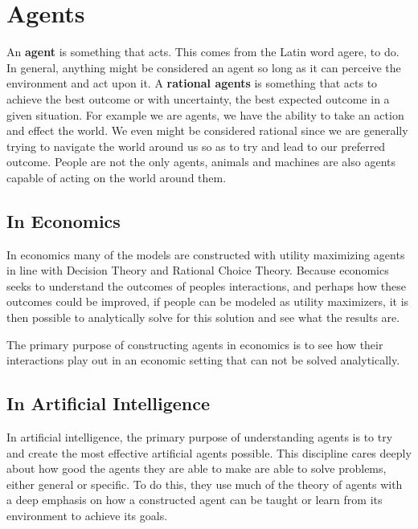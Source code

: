 \documentclass[12pt,twoside]{reedthesis}
\begin{document}
\section{Agents}
An \textbf{agent} is something that acts. This comes from the Latin word agere, to do. In general, anything might be considered an agent so long as it can perceive the environment and act upon it. A \textbf{rational agents} is something that acts to achieve the best outcome or with uncertainty, the best expected outcome in a given situation. For example we are agents, we have the ability to take an action and effect the world. We even might be considered rational since we are generally trying to navigate the world around us so as to try and lead to our preferred outcome. People are not the only agents, animals and machines are also agents capable of acting on the world around them. 

\subsection{In Economics}
In economics many of the models are constructed with utility maximizing agents in line with Decision Theory and Rational Choice Theory. Because economics seeks to understand the outcomes of peoples interactions, and perhaps how these outcomes could be improved, if people can be modeled as utility maximizers, it is then possible to analytically solve for this solution and see what the results are. 

The primary purpose of constructing agents in economics is to see how their interactions play out in an economic setting that can not be solved analytically.  
 
\subsection{In Artificial Intelligence}\label{commands}
In artificial intelligence, the primary purpose of understanding agents is to try and create the most effective artificial agents possible. This discipline cares deeply about how good the agents they are able to make are able to solve problems, either general or specific. To do this, they use much of the theory of agents with a deep emphasis on how a constructed agent can be taught or learn from its environment to achieve its goals.


	
\end{document}
